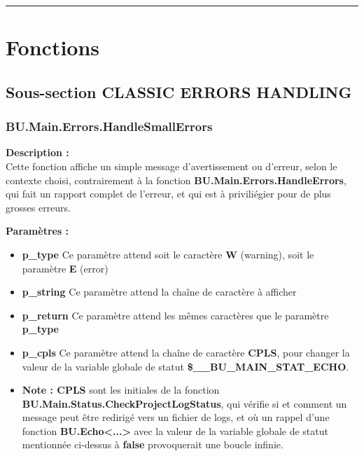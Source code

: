 \documentclass[a4paper,10pt]{article}
\begin{document}
\color{sec1}\par\noindent\rule{\textwidth}{0.4pt}\color{text}

\color{sec1}
\section{Fonctions}\color{text}

\color{sec2}
\subsection{Sous-section CLASSIC ERRORS HANDLING}\color{text}

\color{sec3}
\subsubsection{BU.Main.Errors.HandleSmallErrors}\color{text}

\begin{justify}
    \textbf{Description :}\\
    Cette fonction affiche un simple message d'avertissement ou d'erreur, selon le contexte choisi, contrairement à la fonction \textbf{\color{func}BU.Main.Errors.HandleErrors}, qui fait un rapport complet de l'erreur, et qui est à priviliégier pour de plus grosses erreurs.
\end{justify}

\begin{justify}
    \textbf{Paramètres :}

    \begin{itemize}
        \item \textbf{\color{vars}p\_type} Ce paramètre attend soit le caractère \textbf{W} (warning), soit le paramètre \textbf{E} (error)\\\mbox{}

        \item \textbf{\color{vars}p\_string} Ce paramètre attend la chaîne de caractère à afficher\\\mbox{}

        \item \textbf{\color{vars}p\_return} Ce paramètre attend les mêmes caractères que le paramètre \textbf{\color{vars}p\_type}\\\mbox{}

        \item \textbf{\color{vars}p\_cpls} Ce paramètre attend la chaîne de caractère \textbf{CPLS}, pour changer la valeur de la variable globale de statut \textbf{\color{vars}\$\_\_BU\_MAIN\_STAT\_ECHO}.\\\mbox{}

        \item \textbf{Note : CPLS} sont les initiales de la fonction \textbf{\color{func}BU.Main.Status.CheckProjectLogStatus}, qui vérifie si et comment un message peut être redirigé vers un fichier de logs, et où un rappel d'une fonction \textbf{\color{func}BU.Echo<...>} avec la valeur de la variable globale de statut mentionnée ci-dessus à \textbf{false} provoquerait une boucle infinie.
    \end{itemize}
\end{justify}
\end{document}
